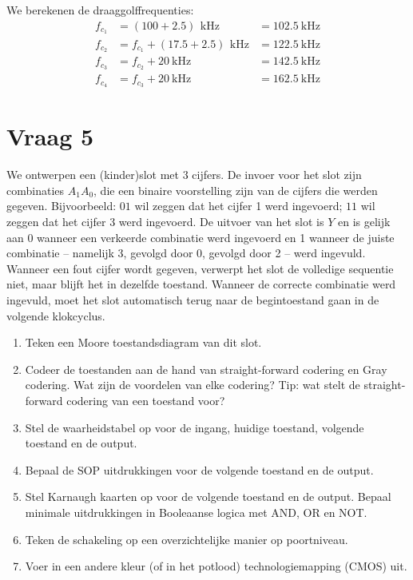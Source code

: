 \documentclass[kulak]{kulakarticle}
\begin{document}
\begin{enumerate}
		We berekenen de draaggolffrequenties: \begin{align*}
			f_{c_1} &= (100 + 2.5) \, \SI{}{\kilo\hertz} &= \SI{102.5}{\kilo\hertz} \\
			f_{c_2} &= f_{c_1} + (17.5 + 2.5) \, \SI{}{\kilo\hertz} &= \SI{122.5}{\kilo\hertz} \\
			f_{c_3} &= f_{c_2} + \SI{20}{\kilo\hertz} &= \SI{142.5}{\kilo\hertz} \\
			f_{c_4} &= f_{c_3} + \SI{20}{\kilo\hertz} &= \SI{162.5}{\kilo\hertz}
		\end{align*}
	\end{enumerate}

	\newpage
	\section*{Vraag 5}

	We ontwerpen een (kinder)slot met 3 cijfers. De invoer voor het slot zijn combinaties \(A_1 A_0\), die een binaire voorstelling zijn van de cijfers die werden gegeven. Bijvoorbeeld: \(01\) wil zeggen dat het cijfer 1 werd ingevoerd; \(11\) wil zeggen dat het cijfer 3 werd ingevoerd. De uitvoer van het slot is \(Y\) en is gelijk aan 0 wanneer een verkeerde combinatie werd ingevoerd en 1 wanneer de juiste combinatie -- namelijk 3, gevolgd door 0, gevolgd door 2 -- werd ingevuld. Wanneer een fout cijfer wordt gegeven, verwerpt het slot de volledige sequentie niet, maar blijft het in dezelfde toestand. Wanneer de correcte combinatie werd ingevuld, moet het slot automatisch terug naar de begintoestand gaan in de volgende klokcyclus.

	\begin{enumerate}
		\item Teken een Moore toestandsdiagram van dit slot.
		\item Codeer de toestanden aan de hand van straight-forward codering en Gray codering. Wat zijn de voordelen van elke codering? Tip: wat stelt de straight-forward codering van een toestand voor?
		\item Stel de waarheidstabel op voor de ingang, huidige toestand, volgende toestand en de output.
		\item Bepaal de SOP uitdrukkingen voor de volgende toestand en de output.
		\item Stel Karnaugh kaarten op voor de volgende toestand en de output. Bepaal minimale uitdrukkingen in Booleaanse logica met AND, OR en NOT.
		\item Teken de schakeling op een overzichtelijke manier op poortniveau.
		\item Voer in een andere kleur (of in het potlood) technologiemapping (CMOS) uit.
	\end{enumerate}
\end{document}
